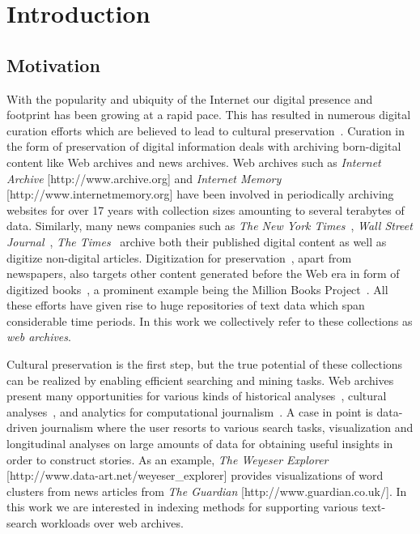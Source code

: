 \chapter{Introduction}
\label{chap:introduction}

\section{Motivation}
\label{sec:motivation}

With the popularity and ubiquity of the Internet our digital presence and footprint has been growing at a rapid pace. This has resulted in numerous digital curation efforts which are believed to lead to cultural preservation~\cite{digitization:cj}. Curation in the form of preservation of digital information deals with archiving born-digital content like Web archives and news archives. Web archives such as \emph{Internet Archive} [http://www.arch\-ive.org] and \emph{Internet Memory} [http://www.internetmemory.org] have been involved in periodically archiving websites for over 17 years with collection sizes amounting to several terabytes of data. Similarly, many news companies such as \emph{The New York Times}~\cite{NYT}, \emph{Wall Street Journal}~\cite{WSJ}, \emph{The Times}~\cite{TIMES} archive both their published digital content as well as digitize non-digital articles. Digitization for preservation~\cite{kulturarw}, apart from newspapers, also targets other content generated before the Web era in form of digitized books~\cite{Coyle2006641}, a prominent example being the Million Books Project~\cite{MBP}. All these efforts have given rise to huge repositories of text data which span considerable time periods. In this work we collectively refer to these collections as \emph{web archives}.

Cultural preservation is the first step, but the true potential of these collections can be realized by enabling efficient searching and mining tasks. Web archives present many opportunities for various kinds of historical analyses~\cite{Schreibman:2008:CDH:1796118, digitalHistory:www}, cultural analyses~\cite{Michel:ys}, and analytics for computational journalism~\cite{Cohen:2011:CJ:2001269.2001288, CohenLYY:cidr11}. A case in point is data-driven journalism where the user resorts to various search tasks, visualization and longitudinal analyses on large amounts of data for obtaining useful insights in order to construct stories. As an example, \emph{The Weyeser Explorer} [http://www.data-art.net/weyeser\_explorer] provides visualizations of word clusters from news articles from \emph{The Guardian} [http://www.guardian.co.uk/]. In this work we are interested in indexing methods for supporting various text-search workloads over web archives. 

